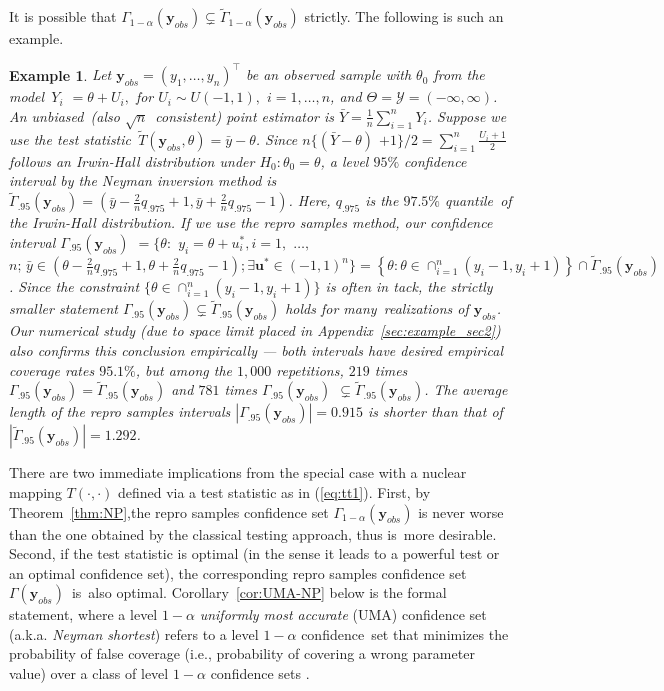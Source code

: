 \documentclass[12pt]{article}
\theoremstyle{shortspace}
\newtheorem{example}{\quad Example}
\def\*#1{\bm{#1}}
\begin{document}
It is possible that $\Gamma_{1-\alpha}(\*y_{obs}) \subsetneq \widetilde \Gamma_{1-\alpha}(\*y_{obs})$ strictly. The following is such an example.  


\begin{example}\label{ex:3}
  Let $\*y_{obs} = (y_1, \ldots, y_n)^\top$ be an observed sample with $\theta_0$ from the model~$Y_i$ $ = \theta + U_i,$ for  $U_i \sim U(-1,1),$  $i = 1, \ldots, n$, and $\Theta 
  = {\mathcal Y} = (-\infty, \infty)$. 
 An unbiased~(also $\sqrt{n}$~consistent) point estimator 
 is $\bar Y = \frac 1n \sum_{i=1}^n Y_i$. Suppose we
   use the test statistic~$\widetilde T(\*y_{obs}, \theta) = \bar y - \theta$. Since $n \{(\bar Y  - \theta) $ $ + 1\}/2 = \sum_{i=1}^n \frac{U_i + 1}2$ follows an Irwin-Hall distribution under $H_0: \theta_0 = \theta$,  
 a level $95\%$ confidence interval by the Neyman inversion 
 method  is $\widetilde \Gamma_{.95}(\*y_{obs}) = (\bar y - \frac2n q_{.975} + 1, \bar y + \frac2n q_{.975} - 1)$. Here, $q_{.975}$ is the $97.5\%$ quantile~of the Irwin-Hall distribution. 
 If we use the repro samples method, our confidence interval
 $\Gamma_{.95}(\*y_{obs})$ $ =  \big\{\theta: $ $ y_{i} = \theta +  u_i^*,
 i = 1, $ $\ldots,$ $ n; \, \bar y \in (\theta - \frac2n q_{.975} + 1, \theta + \frac2n q_{.975} - 1);
\exists  \*u^* \in (-1, 1)^n \big\} = \left\{\theta: \theta \in \cap_{i=1}^n (y_i -1, y_i+1) \right\} \cap \widetilde \Gamma_{.95}(\*y_{obs})$. Since
the constraint $\{\theta \in \cap_{i=1}^n (y_i -1, y_i+1)\}$ is often in tack,
the strictly smaller statement $\Gamma_{.95}(\*y_{obs}) \subsetneq \widetilde \Gamma_{.95}(\*y_{obs})$ holds for many~realizations of $\*y_{obs}$. 
Our numerical study
(due to space limit placed in Appendix~\ref{sec:example_sec2}) also confirms this conclusion empirically --- 
both intervals have desired empirical coverage rates $95.1\%$, but among the $1,000$ repetitions,  $219$ times 
$\Gamma_{.95}(\*y_{obs}) = \widetilde \Gamma_{.95}(\*y_{obs})$ and $781$ times $\Gamma_{.95}(\*y_{obs}) $ $\subsetneq \widetilde \Gamma_{.95}(\*y_{obs})$. The average length  of the repro samples intervals $|\Gamma_{.95}(\*y_{obs})| = 0.915$ is shorter than that of $|\widetilde \Gamma_{.95}(\*y_{obs})| = 1.292$. 
\end{example}

There are two immediate implications from the special case with a nuclear mapping $T(\cdot, \cdot)$ defined via a test statistic as in  (\ref{eq:tt1}).
First, by Theorem~\ref{thm:NP},the repro samples confidence set $\Gamma_{1 - \alpha}(\*y_{obs})$ 
is never worse than the one obtained by the classical testing approach, thus is~more desirable. Second, if the test statistic is optimal (in the sense it leads to a powerful test or an optimal confidence set), the corresponding repro samples confidence set $\Gamma(\*y_{obs})$~is~also optimal. 
Corollary~\ref{cor:UMA-NP} below is the formal statement,
where a level $1 - \alpha$ {\it uniformly most accurate} (UMA) confidence set (a.k.a. {\it Neyman shortest}) refers to a level $1 - \alpha$ confidence~set that minimizes the probability of false coverage (i.e., probability of covering a wrong parameter value) over a class of level $1 - \alpha$ confidence sets \citep[][\S 9.3.2]{tCAS90a}.  
\end{document}
